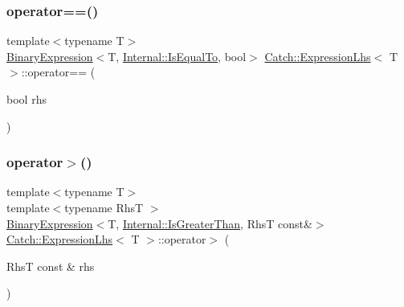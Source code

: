 \subsubsection{\texorpdfstring{operator==()}{operator==()}\hspace{0.1cm}{\footnotesize\ttfamily [2/2]}}
{\footnotesize\ttfamily template$<$typename T$>$ \\
\hyperlink{class_catch_1_1_binary_expression}{Binary\+Expression}$<$T, \hyperlink{namespace_catch_1_1_internal_ae3f96598a7858155750bf38e7295d83ea30e0accba6ec8384f4383b04dd2a6a9e}{Internal\+::\+Is\+Equal\+To}, bool$>$ \hyperlink{class_catch_1_1_expression_lhs}{Catch\+::\+Expression\+Lhs}$<$ T $>$\+::operator== (\begin{DoxyParamCaption}\item[{bool}]{rhs }\end{DoxyParamCaption})\hspace{0.3cm}{\ttfamily [inline]}}

\mbox{\label{class_catch_1_1_expression_lhs_a52981d92ec6aad872660ae7df1abb33a}} 
\subsubsection{\texorpdfstring{operator$>$()}{operator>()}}
{\footnotesize\ttfamily template$<$typename T$>$ \\
template$<$typename RhsT $>$ \\
\hyperlink{class_catch_1_1_binary_expression}{Binary\+Expression}$<$T, \hyperlink{namespace_catch_1_1_internal_ae3f96598a7858155750bf38e7295d83eac0e8866139e99803d169595af70f6c22}{Internal\+::\+Is\+Greater\+Than}, RhsT const\&$>$ \hyperlink{class_catch_1_1_expression_lhs}{Catch\+::\+Expression\+Lhs}$<$ T $>$\+::operator$>$ (\begin{DoxyParamCaption}\item[{RhsT const \&}]{rhs }\end{DoxyParamCaption})\hspace{0.3cm}{\ttfamily [inline]}}

\mbox{\label{class_catch_1_1_expression_lhs_a3387a494cb6b699a6c0162c79f7f533c}} 
